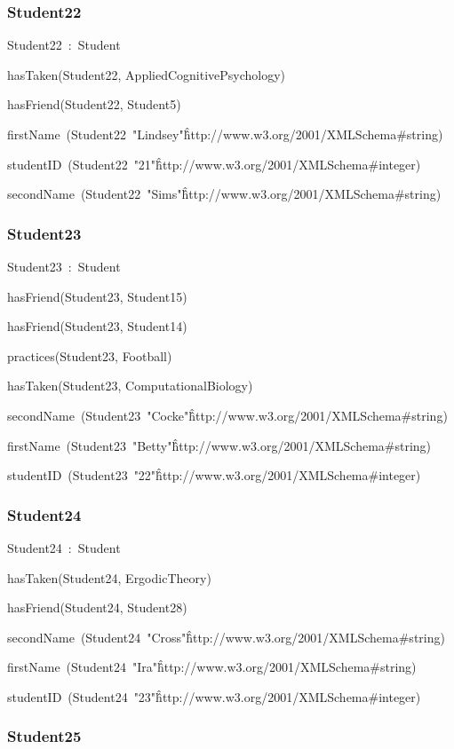 \documentclass{article}
\begin{document}
\subsubsection*{Student22}

Student22~:~Student

hasTaken(Student22, AppliedCognitivePsychology)

hasFriend(Student22, Student5)

firstName~(Student22~"Lindsey"\^\^http://www.w3.org/2001/XMLSchema#string)

studentID~(Student22~"21"\^\^http://www.w3.org/2001/XMLSchema#integer)

secondName~(Student22~"Sims"\^\^http://www.w3.org/2001/XMLSchema#string)

\subsubsection*{Student23}

Student23~:~Student

hasFriend(Student23, Student15)

hasFriend(Student23, Student14)

practices(Student23, Football)

hasTaken(Student23, ComputationalBiology)

secondName~(Student23~"Cocke"\^\^http://www.w3.org/2001/XMLSchema#string)

firstName~(Student23~"Betty"\^\^http://www.w3.org/2001/XMLSchema#string)

studentID~(Student23~"22"\^\^http://www.w3.org/2001/XMLSchema#integer)

\subsubsection*{Student24}

Student24~:~Student

hasTaken(Student24, ErgodicTheory)

hasFriend(Student24, Student28)

secondName~(Student24~"Cross"\^\^http://www.w3.org/2001/XMLSchema#string)

firstName~(Student24~"Ira"\^\^http://www.w3.org/2001/XMLSchema#string)

studentID~(Student24~"23"\^\^http://www.w3.org/2001/XMLSchema#integer)

\subsubsection*{Student25}
\end{document}
